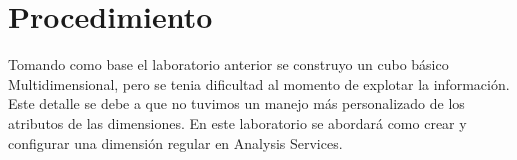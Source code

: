 \documentclass[12pt,letterpaper]{article}
\begin{document}
\section{Procedimiento}

Tomando como base el laboratorio anterior se construyo un cubo básico Multidimensional, pero se tenia
dificultad al momento de explotar la información. Este detalle se debe a que no tuvimos un manejo más
personalizado de los atributos de las dimensiones. En este laboratorio se abordará como crear y configurar
una dimensión regular en Analysis Services.




\end{document}
